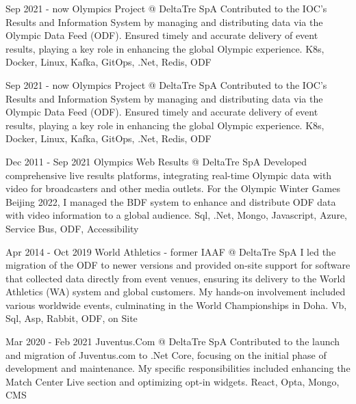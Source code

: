     {Sep 2021 - now}
    {Olympics Project @ DeltaTre SpA}
    {Contributed to the IOC's Results and Information System by managing and distributing data via the Olympic Data Feed (ODF). Ensured timely and accurate delivery of event results, playing a key role in enhancing the global Olympic experience.}
    {K8s, Docker, Linux, Kafka, GitOps, .Net, Redis, ODF }
    
    {Sep 2021 - now}
    {Olympics Project @ DeltaTre SpA}
    {Contributed to the IOC's Results and Information System by managing and distributing data via the Olympic Data Feed (ODF). Ensured timely and accurate delivery of event results, playing a key role in enhancing the global Olympic experience.}
    {K8s, Docker, Linux, Kafka, GitOps, .Net, Redis, ODF }

    {Dec 2011 - Sep 2021}
    {Olympics Web Results @ DeltaTre SpA}
    {Developed comprehensive live results platforms, integrating real-time Olympic data with video for broadcasters and other media outlets. For the Olympic Winter Games Beijing 2022, I managed the BDF system to enhance and distribute ODF data with video information to a global audience.}
    {Sql, .Net, Mongo, Javascript, Azure, Service Bus, ODF, Accessibility }

    {Apr 2014 - Oct 2019}
    {World Athletics - former IAAF @ DeltaTre SpA}
    {I led the migration of the ODF to newer versions and provided on-site support for software that collected data directly from event venues, ensuring its delivery to the World Athletics (WA) system and global customers. My hands-on involvement included various worldwide events, culminating in the World Championships in Doha. }
    {Vb, Sql, Asp, Rabbit, ODF, on Site}

    {Mar 2020 - Feb 2021}
    {Juventus.Com @ DeltaTre SpA}
    {Contributed to the launch and migration of Juventus.com to .Net Core, focusing on the initial phase of development and maintenance. My specific responsibilities included enhancing the Match Center Live section and optimizing opt-in widgets.}
    {React, Opta, Mongo, CMS}
